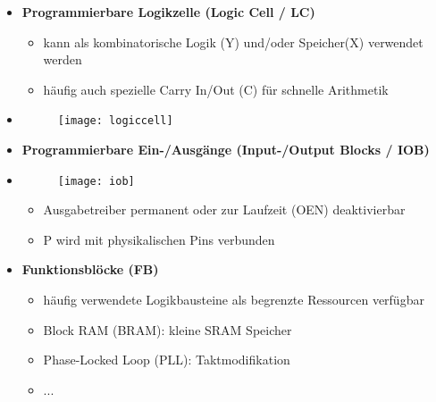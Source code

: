\begin{itemize}
\item \textbf{Programmierbare Logikzelle (Logic Cell / LC)}
	\begin{itemize}
	\item kann als kombinatorische Logik (Y) und/oder Speicher(X) verwendet werden
	\item häufig auch spezielle Carry In/Out (C) für schnelle Arithmetik
	\end{itemize}
\item[]
			\begin{figure}[H]
			\begin{center}
			\texttt{[image: logiccell]}
			\end{center}
			\end{figure}

\item \textbf{Programmierbare Ein-/Ausgänge (Input-/Output Blocks / IOB)}
\item[]
		\begin{minipage}{0.3\textwidth}
				\begin{figure}[H]
				\texttt{[image: iob]}
				\end{figure}
			\end{minipage}
			\begin{minipage}[t]{0.6\textwidth}
				\vspace{-1.5cm}
				\begin{itemize}
				\item Ausgabetreiber permanent oder zur Laufzeit (OEN) deaktivierbar
				\item P wird mit physikalischen Pins verbunden
				\end{itemize}
			\end{minipage}

\item \textbf{Funktionsblöcke (FB)}
	\begin{itemize}
	\item häufig verwendete Logikbausteine als begrenzte Ressourcen verfügbar
	\item Block RAM (BRAM): kleine SRAM Speicher
	\item Phase-Locked Loop (PLL): Taktmodifikation
	\item ...
	\end{itemize}

\end{itemize}



